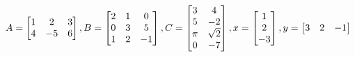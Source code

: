 \documentclass[11pt,fleqn]{article}
\newcommand{\bbm}{\begin{bmatrix}}
\newcommand{\ebm}{\end{bmatrix}}
\def\vecthree#1#2#3{\begin{bmatrix}#1\\#2\\#3\end{bmatrix}}
\begin{document}
\renewcommand{\headrulewidth}{0pt}
\newcommand{\blank}[1]{\rule{#1}{0.75pt}}
\renewcommand{\d}{\displaystyle}
\vspace*{-0.7in}
\begin{center}
 \textbf{ \large {} }
\end{center}



$A=\bbm 1&2&3\\4&-5&6 \ebm, \hfill B=\bbm 2&1&0\\ 0&3&5\\
1&2&-1\ebm,  \hfill C= \bbm 3&4\\5&-2\\ \pi& \sqrt{2}\\0&-7 \ebm, \hfill x=\vecthree 1 2 {-3}, \hfill y= \bbm 3 & 2& {-1} \ebm$
\vspace{2.5in}
\end{document}
